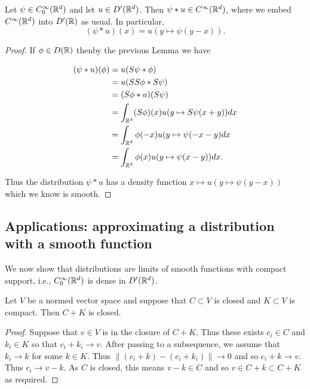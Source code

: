 \documentclass[twoside, a4paper, 10pt]{amsart}
\begin{document}
\begin{thm} \label{thm: convolution of function with distribution is function}  Let $\psi \in C_0^{\infty}(\mathbb{R}^d)$ and let $u \in D'(\mathbb{R}^d)$. Then $\psi * u \in C^{\infty}(\mathbb{R}^d)$, where we embed $C^{\infty}(\mathbb{R}^d)$ into $D'(\mathbb{R})$ as usual. In particular, $$(\psi * u) (x) = u(y \mapsto \psi(y-x)) .$$

\end{thm}

\begin{proof} If $\phi \in D(\mathbb{R})$ thenby the previous Lemma we have 

\begin{align*} (\psi * u)(\phi) &= u(S\psi * \phi) \\ &= u(SS\phi * S\psi) \\ &= (S\phi * u)(S\psi) \\
&= \int_{\mathbb{R}^d} (S\phi) (x) u(y \mapsto S\psi(x+y)) dx \\ 
&= \int_{\mathbb{R}^d} \phi(-x) u(y \mapsto \psi(-x-y) dx \\ &= \int_{\mathbb{R}^d} \phi(x) u(y \mapsto \psi(x-y)) dx. \end{align*}

Thus the distribution $\psi * u$ has a density function $x \mapsto u(y \mapsto \psi(y-x))$ which we know is smooth.

\end{proof}

\subsection{Applications: approximating a distribution with a smooth function}

We now show that distributions are limits of smooth functions with compact support, i.e., $C^{\infty}_0(\mathbb{R}^d)$ is dense in $D'(\mathbb{R}^d)$.

\begin{lemma} Let $V$ be a normed vector space and suppose that $C \subset V$ is closed and $K \subset V$ is compact. Then $C+K$ is closed.

\end{lemma}

\begin{proof} Suppose that $v \in V$ is in the closure of $C+K$. Thus these exists $c_i \in C$ and $k_i \in K$ so that $c_i + k_i \to v$. After passing to a subsequence, we assume that $k_i \to k$ for some $k \in K$. Thus $\|(c_i + k) - (c_i + k_i)\| \to 0$ and so $c_i + k \to v$. Thus $c_i \to v - k$. As $C$ is closed, this means $v-k \in C$ and so $v \in C+k \subset C+K$ as required. \end{proof}
\end{document}
